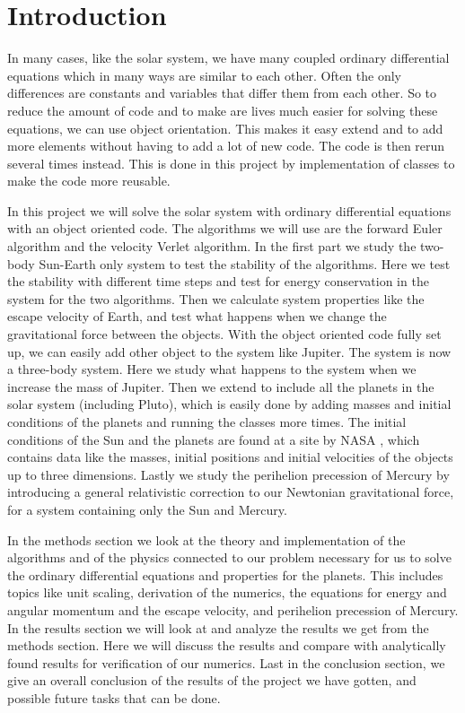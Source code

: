 \documentclass[12pt,a4paper,english]{article}
\begin{document}
\section{Introduction}
\label{sect:Introduction}
In many cases, like the solar system, we have many coupled ordinary differential equations which in many ways are similar to each other. Often the only differences are constants and variables that differ them from each other. So to reduce the amount of code and to make are lives much easier for solving these equations, we can use object orientation. This makes it easy extend and to add more elements without having to add a lot of new code. The code is then rerun several times instead. This is done in this project by implementation of classes to make the code more reusable.

In this project we will solve the solar system with ordinary differential equations with an object oriented code. The algorithms we will use are the forward Euler algorithm and the velocity Verlet algorithm. In the first part we study the two-body Sun-Earth only system to test the stability of the algorithms. Here we test the stability with different time steps and test for energy conservation in the system for the two algorithms. Then we calculate system properties like the escape velocity of Earth, and test what happens when we change the gravitational force between the objects. With the object oriented code fully set up, we can easily add other object to the system like Jupiter. The system is now a three-body system. Here we study what happens to the system when we increase the mass of Jupiter. Then we extend to include all the planets in the solar system (including Pluto), which is easily done by adding masses and initial conditions of the planets and running the classes more times. The initial conditions of the Sun and the planets are found at a site by NASA \cite{horizon}, which contains data like the masses, initial positions and initial velocities of the objects up to three dimensions. Lastly we study the perihelion precession of Mercury by introducing a general relativistic correction to our Newtonian gravitational force, for a system containing only the Sun and Mercury.

In the methods section we look at the theory and implementation of the algorithms and of the physics connected to our problem necessary for us to solve the ordinary differential equations and properties for the planets. This includes topics like unit scaling, derivation of the numerics, the equations for energy and angular momentum and the escape velocity, and perihelion precession of Mercury. In the results section we will look at and analyze the results we get from the methods section. Here we will discuss the results and compare with analytically found results for verification of our numerics. Last in the conclusion section, we give an overall conclusion of the results of the project we have gotten, and possible future tasks that can be done.
\end{document}
